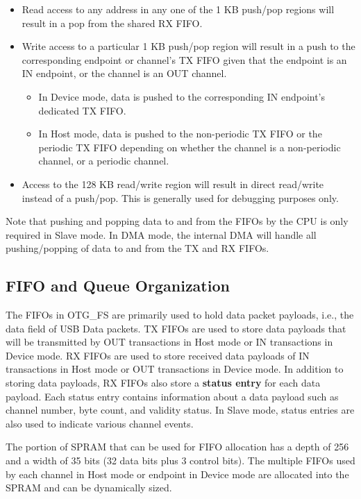\documentclass[main\_\_EN.tex]{subfiles}
\begin{document}
\begin{itemize}
    \item Read access to any address in any one of the 1 KB push/pop regions will result in a pop from the shared RX FIFO.
    \item Write access to a particular 1 KB push/pop region will result in a push to the corresponding endpoint or channel’s TX FIFO given that the endpoint is an IN endpoint, or the channel is an OUT channel.
    \begin{itemize}
        \item In Device mode, data is pushed to the corresponding IN endpoint’s dedicated TX FIFO.
        \item In Host mode, data is pushed to the non-periodic TX FIFO or the periodic TX FIFO depending on whether the channel is a non-periodic channel, or a periodic channel.
    \end{itemize}
    \item Access to the 128 KB read/write region will result in direct read/write instead of a push/pop. This is generally used for debugging purposes only.
\end{itemize}

Note that pushing and popping data to and from the FIFOs by the CPU is only required in Slave mode. In DMA mode, the internal DMA will handle all pushing/popping of data to and from the TX and RX FIFOs.

\subsection{FIFO and Queue Organization}
\label{sec:usbotgfs-fifo-queue-orga}

The FIFOs in OTG\_FS are primarily used to hold data packet payloads, i.e., the data field of USB Data packets. TX FIFOs are used to store data payloads that will be transmitted by OUT transactions in Host mode or IN transactions in Device mode. RX FIFOs are used to store received data payloads of IN transactions in Host mode or OUT transactions in Device mode. In addition to storing data payloads, RX FIFOs also store a \textbf{status entry} for each data payload. Each status entry contains information about a data payload such as channel number, byte count, and validity status. In Slave mode, status entries are also used to indicate various channel events.

The portion of SPRAM that can be used for FIFO allocation has a depth of 256 and a width of 35 bits (32 data bits plus 3 control bits). The multiple FIFOs used by each channel in Host mode or endpoint in Device mode are allocated into the SPRAM and can be dynamically sized.
\end{document}
